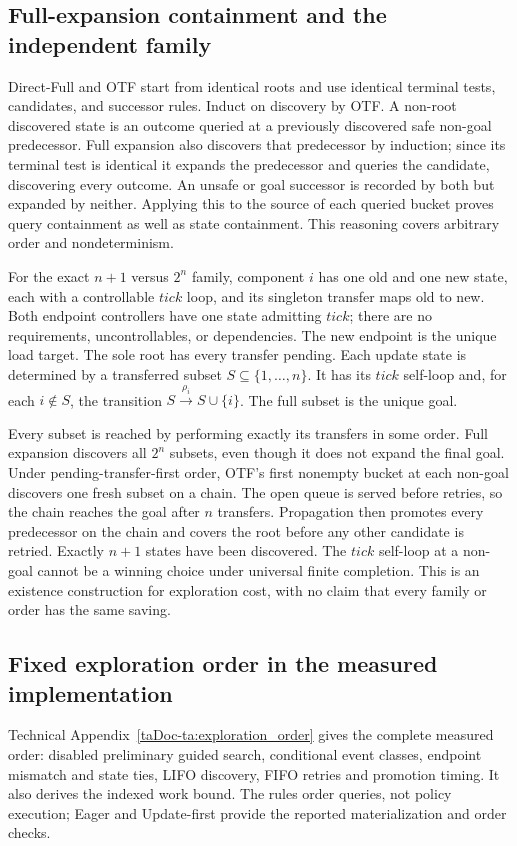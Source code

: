 \documentclass[11pt]{article}
\begin{document}
\subsection{Full-expansion containment and the independent family}
\label{supp:independent-family}
Direct-Full and OTF start from identical roots and use identical terminal tests, candidates, and successor rules. Induct on discovery by OTF. A non-root discovered state is an outcome queried at a previously discovered safe non-goal predecessor. Full expansion also discovers that predecessor by induction; since its terminal test is identical it expands the predecessor and queries the candidate, discovering every outcome. An unsafe or goal successor is recorded by both but expanded by neither. Applying this to the source of each queried bucket proves query containment as well as state containment. This reasoning covers arbitrary order and nondeterminism.

For the exact $n+1$ versus $2^n$ family, component $i$ has one old and one new state, each with a controllable $tick$ loop, and its singleton transfer maps old to new. Both endpoint controllers have one state admitting $tick$; there are no requirements, uncontrollables, or dependencies. The new endpoint is the unique load target. The sole root has every transfer pending. Each update state is determined by a transferred subset $S\subseteq\{1,\ldots,n\}$. It has its $tick$ self-loop and, for each $i\notin S$, the transition $S\xrightarrow{\rho_i}S\cup\{i\}$. The full subset is the unique goal.

Every subset is reached by performing exactly its transfers in some order. Full expansion discovers all $2^n$ subsets, even though it does not expand the final goal. Under pending-transfer-first order, OTF's first nonempty bucket at each non-goal discovers one fresh subset on a chain. The open queue is served before retries, so the chain reaches the goal after $n$ transfers. Propagation then promotes every predecessor on the chain and covers the root before any other candidate is retried. Exactly $n+1$ states have been discovered. The $tick$ self-loop at a non-goal cannot be a winning choice under universal finite completion. This is an existence construction for exploration cost, with no claim that every family or order has the same saving.

\subsection{Fixed exploration order in the measured implementation}
\label{supp:ordering}
Technical Appendix~\ref{taDoc-ta:exploration_order} gives the complete measured order: disabled preliminary guided search, conditional event classes, endpoint mismatch and state ties, LIFO discovery, FIFO retries and promotion timing. It also derives the indexed work bound. The rules order queries, not policy execution; Eager and Update-first provide the reported materialization and order checks.
\end{document}
